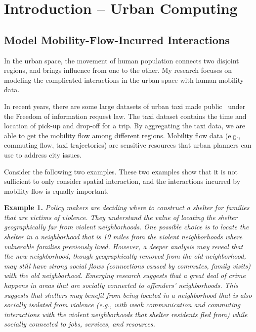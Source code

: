 \chapter{Introduction -- Urban Computing} \label{chapter1:introduction}





\section{Model Mobility-Flow-Incurred Interactions}


In the urban space, the movement of human population connects two disjoint regions, and brings influence from one to the other. My research focuses on modeling the complicated interactions in the urban space with human mobility data.  


In recent years, there are some large datasets of urban taxi made public~\cite{nyctaxi} under the Freedom of information request law.  The taxi dataset contains the time and location of pick-up and drop-off for a trip. By aggregating the taxi data, we are able to get the mobility flow among different regions.
Mobility flow data (e.g., commuting flow, taxi trajectories) are sensitive resources that urban planners can use to address city issues.




Consider the following two examples. These two examples show that it is not sufficient to only consider spatial interaction, and the interactions incurred by mobility flow is equally important.


\textbf{Example 1.} \emph{Policy makers are deciding where to construct a shelter for families that are victims of violence. They understand the value of locating the shelter geographically far from violent neighborhoods. One possible choice is to locate the shelter in a neighborhood that is 10 miles from the violent neighborhoods where vulnerable families previously lived. However, a deeper analysis may reveal that the new neighborhood, though geographically removed from the old neighborhood, may still have strong social flows (connections caused by commutes, family visits) with the old neighborhood. Emerging research suggests that a great deal of crime happens in areas that are socially connected to offenders' neighborhoods. This suggests that shelters may benefit from being located in a neighborhood that is also socially isolated from violence (e.g., with weak communication and commuting interactions with the violent neighborhoods that shelter residents fled from) while socially connected to jobs, services, and resources.}


